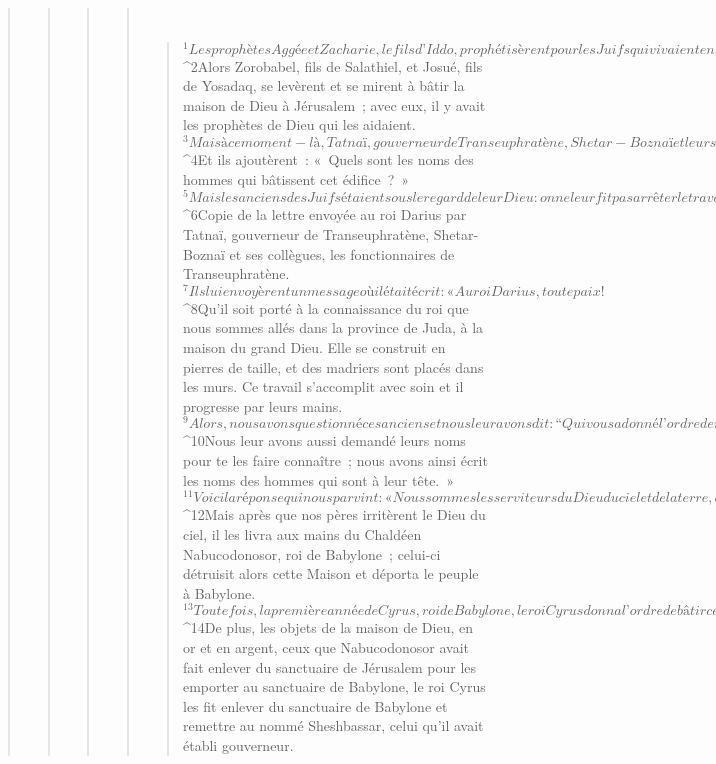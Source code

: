\begin{verse}
\begin{verse}
\begin{verse}
\begin{verse}
         
      \bchapter{}
      \begin{verse}
${}^{1}Les prophètes Aggée et Zacharie, le fils d’Iddo, prophétisèrent pour les Juifs qui vivaient en Juda et à Jérusalem, au nom du Dieu d’Israël qui était sur eux. 
${}^{2}Alors Zorobabel, fils de Salathiel, et Josué, fils de Yosadaq, se levèrent et se mirent à bâtir la maison de Dieu à Jérusalem ; avec eux, il y avait les prophètes de Dieu qui les aidaient. 
${}^{3}Mais à ce moment-là, Tatnaï, gouverneur de Transeuphratène, Shetar-Boznaï et leurs collègues vinrent vers eux et leur dirent : « Qui vous a donné l’ordre de rebâtir cette Maison, de relever cette construction ? » 
${}^{4}Et ils ajoutèrent : « Quels sont les noms des hommes qui bâtissent cet édifice ? » 
${}^{5}Mais les anciens des Juifs étaient sous le regard de leur Dieu : on ne leur fit pas arrêter le travail jusqu’à ce que le rapport parvienne chez Darius et que revienne ensuite l’acte officiel à ce sujet.
${}^{6}Copie de la lettre envoyée au roi Darius par Tatnaï, gouverneur de Transeuphratène, Shetar-Boznaï et ses collègues, les fonctionnaires de Transeuphratène. 
${}^{7}Ils lui envoyèrent un message où il était écrit : « Au roi Darius, toute paix ! 
${}^{8}Qu’il soit porté à la connaissance du roi que nous sommes allés dans la province de Juda, à la maison du grand Dieu. Elle se construit en pierres de taille, et des madriers sont placés dans les murs. Ce travail s’accomplit avec soin et il progresse par leurs mains. 
${}^{9}Alors, nous avons questionné ces anciens et nous leur avons dit : “Qui vous a donné l’ordre de rebâtir cette Maison, de relever cette construction ?” 
${}^{10}Nous leur avons aussi demandé leurs noms pour te les faire connaître ; nous avons ainsi écrit les noms des hommes qui sont à leur tête. »
${}^{11}Voici la réponse qui nous parvint : « Nous sommes les serviteurs du Dieu du ciel et de la terre, et nous rebâtissons la Maison construite jadis, il y a de longues années. Un grand roi d’Israël l’avait construite et achevée. 
${}^{12}Mais après que nos pères irritèrent le Dieu du ciel, il les livra aux mains du Chaldéen Nabucodonosor, roi de Babylone ; celui-ci détruisit alors cette Maison et déporta le peuple à Babylone. 
${}^{13}Toutefois, la première année de Cyrus, roi de Babylone, le roi Cyrus donna l’ordre de bâtir cette maison de Dieu. 
${}^{14}De plus, les objets de la maison de Dieu, en or et en argent, ceux que Nabucodonosor avait fait enlever du sanctuaire de Jérusalem pour les emporter au sanctuaire de Babylone, le roi Cyrus les fit enlever du sanctuaire de Babylone et remettre au nommé Sheshbassar, celui qu’il avait établi gouverneur. 

\end{verse}
\end{verse}
\end{verse}
\end{verse}
\end{verse}
